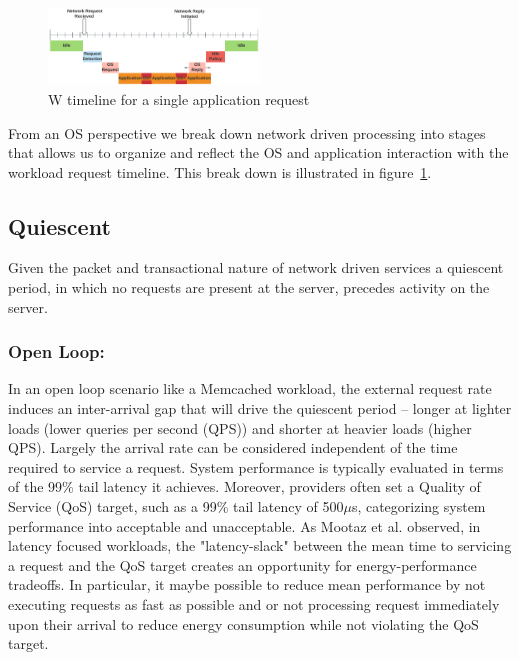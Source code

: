 \label{sec:workflow}


\begin{figure}
\centering
\includegraphics[width=0.5\textwidth]{figures/timeline_chart}
\caption[]{W timeline for a single application request}
\label{fig:timeline}
\end{figure}

From an OS perspective we break down network driven processing into stages that allows us to organize and reflect the OS and application interaction with the workload request timeline.  This break down is illustrated in figure~\ref{fig:timeline}.   

\subsection{Quiescent}
Given the packet and transactional nature of network driven services a quiescent period, in which no requests are present at the server, precedes activity on the server. 

\subsubsection{Open Loop:}
In an open loop scenario like a Memcached workload, the external request rate induces an inter-arrival gap that will drive the quiescent period -- longer at lighter loads (lower queries per second (QPS)) and shorter at heavier loads (higher QPS). Largely the arrival rate can be considered independent of the time required to service a request.  System performance is typically evaluated in terms of the 99\% tail latency it achieves.  Moreover, providers often set a Quality of Service (QoS) target, such as  a 99\% tail latency of 500${\mu}$s, categorizing system performance into acceptable and unacceptable.  As Mootaz et al.\cite{mootaz} observed, in latency focused workloads, the "latency-slack" between the mean time to servicing a request and the QoS target creates an opportunity for energy-performance tradeoffs.  In particular, it maybe possible to reduce mean performance by not executing requests as fast as possible and or not processing request immediately upon their arrival to reduce energy consumption while not violating the QoS target.  

